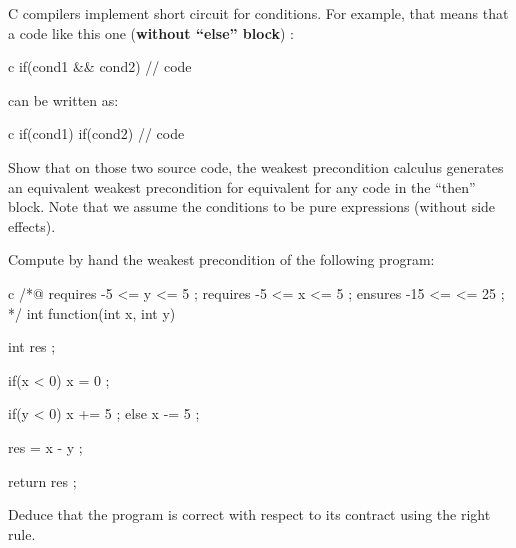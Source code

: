C compilers implement short circuit for conditions. For example, that
means that a code like this one (\textbf{without ``else'' block}) :


\begin{CodeBlock}{c}
if(cond1 && cond2){
  // code
}
\end{CodeBlock}



can be written as:



\begin{CodeBlock}{c}
if(cond1){
  if(cond2){
    // code
  }
}
\end{CodeBlock}



Show that on those two source code, the weakest precondition calculus
generates an equivalent weakest precondition for equivalent for any code
in the ``then'' block. Note that we assume the conditions to be pure
expressions (without side effects).





Compute by hand the weakest precondition of the following program:


\begin{CodeBlock}{c}
/*@
  requires -5 <= y <= 5 ;
  requires -5 <= x <= 5 ;
  ensures  -15 <= \result <= 25 ;
*/
int function(int x, int y){
  int res ;

  if(x < 0){
    x = 0 ;
  }

  if(y < 0){
    x += 5 ;
  } else {
    x -= 5 ;
  }

  res = x - y ;

  return res ;
}
\end{CodeBlock}


Deduce that the program is correct with respect to its contract using the
right rule.
